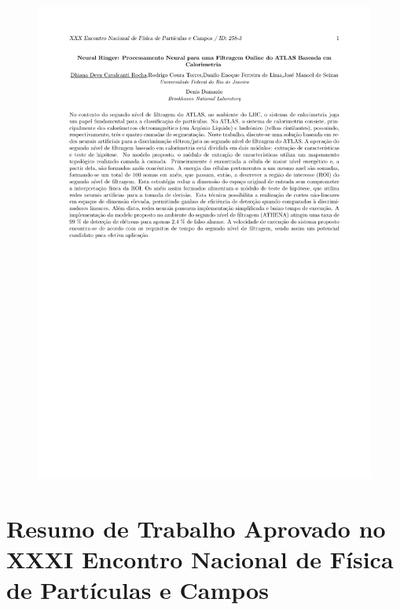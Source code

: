 \documentclass[a4paper,10pt,titlepage]{article}
\begin{document}
\begin{figure}[htbp!]
 \includegraphics[scale=0.8,keepaspectratio=true,clip=true,trim=55px 300px 50px 50px]{Figs/abstracts/enfpc_xxx/R0258-3.pdf}
\end{figure}

\clearpage

\section{Resumo de Trabalho Aprovado no XXXI Encontro Nacional de Física de Partículas e Campos}
\end{document}
